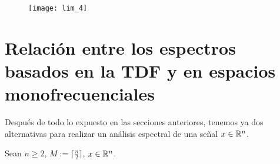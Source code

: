 \begin{figure}[H]
	\centering
	\texttt{[image: lim\_4]} 
\end{figure}

\section{Relación entre los espectros basados en la TDF y en espacios monofrecuenciales}

Después de todo lo expuesto en las secciones anteriores, tenemos
ya dos alternativas para realizar un análisis
espectral de una señal $x \in \mathbb{R}^{n}$.

Sean $n \geq 2$, $M := \lceil \frac{n}{2} \rceil$, $x \in \mathbb{R}^{n}$.
